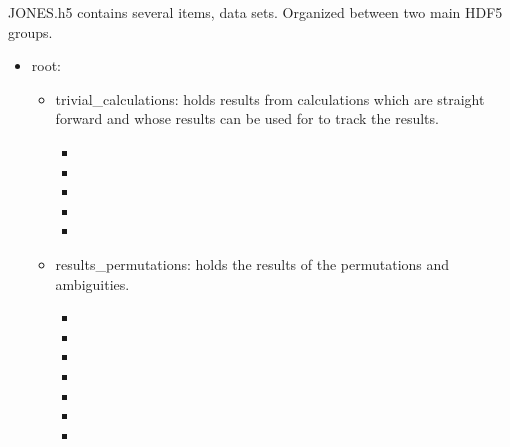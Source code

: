 \documentclass[letterpaper,10pt,english]{sphinxmanual}
\begin{document}
JONES.h5 contains several items, data sets. Organized between two main HDF5 groups.
\begin{itemize}
\item {} 
root:
\begin{itemize}
\item {} 
trivial\_calculations: holds results from calculations which are straight forward and whose results can be used for to track the results.
\begin{itemize}
\item {} 

\item {} 

\item {} 

\item {} 

\item {} 

\end{itemize}

\item {} 
results\_permutations: holds the results of the permutations and ambiguities.
\begin{itemize}
\item {} 

\item {} 

\item {} 

\item {} 

\item {} 

\item {} 

\item {} 

\end{itemize}

\end{itemize}

\end{itemize}
\end{document}
